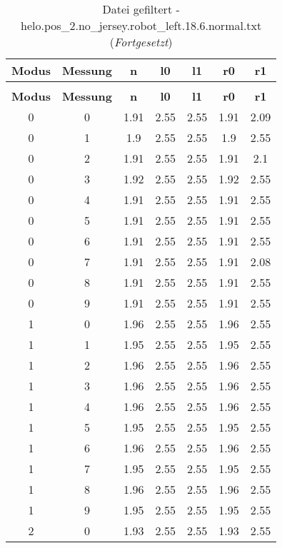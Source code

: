 \begin{longtable}{|c|c||c||c|c||c|c|}
	\caption{Datei gefiltert - helo.pos\_2.no\_jersey.robot\_left.18.6.normal.txt} \label{tab:helo.pos-2.no-jersey.robot-left.18.6.normal.txt} \\ \hline
	\textbf{Modus} & \textbf{Messung} & \textbf{n} & \textbf{l0} & \textbf{l1} & \textbf{r0} & \textbf{r1}\\ \hline
	\endfirsthead
	\caption[]{Datei gefiltert - helo.pos\_2.no\_jersey.robot\_left.18.6.normal.txt (\emph{Fortgesetzt})} \\ \hline
	\textbf{Modus} & \textbf{Messung} & \textbf{n} & \textbf{l0} & \textbf{l1} & \textbf{r0} & \textbf{r1}\\ \hline
	\endhead
	0 & 0 & 1.91 & 2.55 & 2.55 & 1.91 & 2.09 \\ \hline
	0 & 1 & 1.9 & 2.55 & 2.55 & 1.9 & 2.55 \\ \hline
	0 & 2 & 1.91 & 2.55 & 2.55 & 1.91 & 2.1 \\ \hline
	0 & 3 & 1.92 & 2.55 & 2.55 & 1.92 & 2.55 \\ \hline
	0 & 4 & 1.91 & 2.55 & 2.55 & 1.91 & 2.55 \\ \hline
	0 & 5 & 1.91 & 2.55 & 2.55 & 1.91 & 2.55 \\ \hline
	0 & 6 & 1.91 & 2.55 & 2.55 & 1.91 & 2.55 \\ \hline
	0 & 7 & 1.91 & 2.55 & 2.55 & 1.91 & 2.08 \\ \hline
	0 & 8 & 1.91 & 2.55 & 2.55 & 1.91 & 2.55 \\ \hline
	0 & 9 & 1.91 & 2.55 & 2.55 & 1.91 & 2.55 \\ \hline
	1 & 0 & 1.96 & 2.55 & 2.55 & 1.96 & 2.55 \\ \hline
	1 & 1 & 1.95 & 2.55 & 2.55 & 1.95 & 2.55 \\ \hline
	1 & 2 & 1.96 & 2.55 & 2.55 & 1.96 & 2.55 \\ \hline
	1 & 3 & 1.96 & 2.55 & 2.55 & 1.96 & 2.55 \\ \hline
	1 & 4 & 1.96 & 2.55 & 2.55 & 1.96 & 2.55 \\ \hline
	1 & 5 & 1.95 & 2.55 & 2.55 & 1.95 & 2.55 \\ \hline
	1 & 6 & 1.96 & 2.55 & 2.55 & 1.96 & 2.55 \\ \hline
	1 & 7 & 1.95 & 2.55 & 2.55 & 1.95 & 2.55 \\ \hline
	1 & 8 & 1.96 & 2.55 & 2.55 & 1.96 & 2.55 \\ \hline
	1 & 9 & 1.95 & 2.55 & 2.55 & 1.95 & 2.55 \\ \hline
	2 & 0 & 1.93 & 2.55 & 2.55 & 1.93 & 2.55 \\ \hline

\end{longtable}
